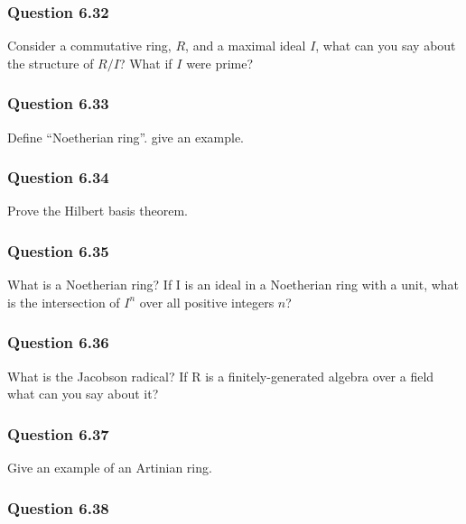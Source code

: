 \hypertarget{question-6.32}{%
\subsubsection{Question 6.32}\label{question-6.32}}

Consider a commutative ring, \(R\), and a maximal ideal \(I\), what can
you say about the structure of \(R/I\)? What if \(I\) were prime?

\hypertarget{question-6.33}{%
\subsubsection{Question 6.33}\label{question-6.33}}

Define ``Noetherian ring''. give an example.

\hypertarget{question-6.34}{%
\subsubsection{Question 6.34}\label{question-6.34}}

Prove the Hilbert basis theorem.

\hypertarget{question-6.35}{%
\subsubsection{Question 6.35}\label{question-6.35}}

What is a Noetherian ring? If I is an ideal in a Noetherian ring with a
unit, what is the intersection of \(I^n\) over all positive integers
\(n\)?

\hypertarget{question-6.36}{%
\subsubsection{Question 6.36}\label{question-6.36}}

What is the Jacobson radical? If R is a finitely-generated algebra over
a field what can you say about it?

\hypertarget{question-6.37}{%
\subsubsection{Question 6.37}\label{question-6.37}}

Give an example of an Artinian ring.

\hypertarget{question-6.38}{%
\subsubsection{Question 6.38}\label{question-6.38}}

